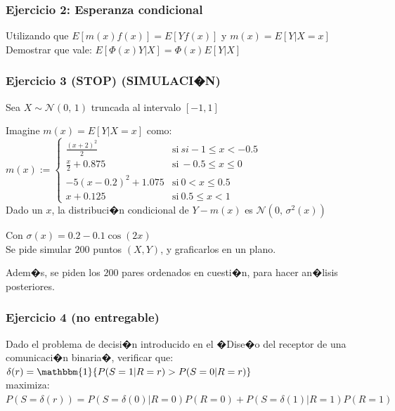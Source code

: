 \documentclass[a4paper,10pt]{article}
\begin{document}
	
	\subsubsection{Ejercicio 2: Esperanza condicional}	
	
	Utilizando que
	$E[m(x) f(x)] = E[Yf(x)]$ y $ m(x)=E[Y|X=x]$\\
	
	Demostrar que vale:
  $E[\Phi(x)Y| X] = \Phi(x)E[Y|X]$
	
	
	\subsubsection{Ejercicio 3 (STOP) (SIMULACI�N)}
	
	Sea $ X \sim \mathcal{N}(0,\, 1)$ truncada al intervalo $\left[-1,1\right]$	
	
	Imagine  $m(x) = E[Y | X=x]$ como:\\
	
	   $
	   m(x) := \left\{
	   \begin{array}{ll}
	   \frac{(x + 2)^2}{2} & \mathrm{si\ } si -1\leq x<-0.5 \\
	   \frac{x}{2}+0.875     & \mathrm{si\ } -0.5 \leq x \leq 0\\
	   -5(x-0.2)^2 +1.075 & \mathrm{si\ } 0 < x \leq 0.5 \\
	   x + 0.125 & \mathrm{si\ } 0.5 \leq x < 1 
	   \end{array}
	   \right.
	   $
	\\

	Dado un $x$, la distribuci�n condicional de $Y - m(x)$ es
	$\mathcal{N}(0,\, \sigma^2(x))$
	
	Con $\sigma(x)=0.2-0.1\cos(2x)$\\
	
	Se pide simular $200$ puntos $(X,Y)$, y graficarlos en un plano. 
	
	Adem�s, se piden los $200$ pares ordenados en cuesti�n, para hacer an�lisis posteriores.
	
	
	\subsubsection{Ejercicio 4 (no entregable)}
	

	Dado el problema de decisi�n introducido en el �Dise�o del receptor de una comunicaci�n binaria�, verificar que:\\ 
	$\delta(r) = \mathbbm{1}\{{ P(S=1 | R=r) > P(S=0 | R = r) }\}$\\ maximiza:\\
	$P(S=\delta(r)) =P(S=\delta(0) | R=0)P(R=0) + P(S=\delta(1) | R=1)P(R=1)$
	
\end{document}
